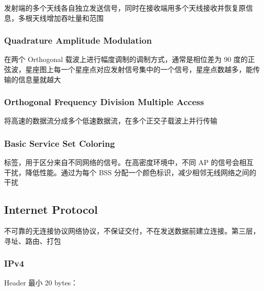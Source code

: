 \documentclass[11pt,journal,compsoc]{IEEEtran}
\begin{document}
发射端的多个天线各自独立发送信号，同时在接收端用多个天线接收并恢复原信息，多根天线增加吞吐量和范围


\subsubsection{Quadrature Amplitude Modulation}

在两个 Orthogonal 载波上进行幅度调制的调制方式，通常是相位差为 90 度的正弦波，星座图上每一个星座点对应发射信号集中的一个信号，星座点数越多，能传输的信息量就越大


\subsubsection{Orthogonal Frequency Division Multiple Access}

将高速的数据流分成多个低速数据流，在多个正交子载波上并行传输


\subsubsection{Basic Service Set Coloring}

标签，用于区分来自不同网络的信号。在高密度环境中，不同 AP 的信号会相互干扰，降低性能。通过为每个 BSS 分配一个颜色标识，减少相邻无线网络之间的干扰


\subsection{Internet Protocol}

不可靠的无连接协议网络协议，不保证交付，不在发送数据前建立连接。第三层，寻址、路由、打包


\subsubsection{IPv4}

Header 最小 20 bytes：
\end{document}
